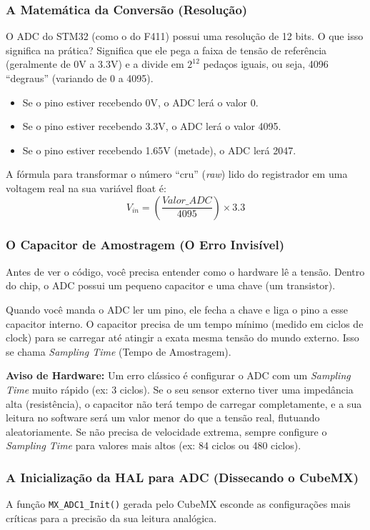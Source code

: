 \documentclass[12pt,a4paper]{article}
\begin{document}
\subsubsection{A Matemática da Conversão (Resolução)}
O ADC do STM32 (como o do F411) possui uma resolução de 12 bits. O que isso significa na prática?
Significa que ele pega a faixa de tensão de referência (geralmente de 0V a 3.3V) e a divide em $2^{12}$ pedaços iguais, ou seja, 4096 ``degraus'' (variando de 0 a 4095).
\begin{itemize}
    \item Se o pino estiver recebendo 0V, o ADC lerá o valor 0.
    \item Se o pino estiver recebendo 3.3V, o ADC lerá o valor 4095.
    \item Se o pino estiver recebendo 1.65V (metade), o ADC lerá 2047.
\end{itemize}

A fórmula para transformar o número ``cru'' (\textit{raw}) lido do registrador em uma voltagem real na sua variável float é:
\[ V_{in} = \left( \frac{Valor\_ADC}{4095} \right) \times 3.3 \]

\subsubsection{O Capacitor de Amostragem (O Erro Invisível)}
Antes de ver o código, você precisa entender como o hardware lê a tensão. Dentro do chip, o ADC possui um pequeno capacitor e uma chave (um transistor).



Quando você manda o ADC ler um pino, ele fecha a chave e liga o pino a esse capacitor interno. O capacitor precisa de um tempo mínimo (medido em ciclos de clock) para se carregar até atingir a exata mesma tensão do mundo externo. Isso se chama \textit{Sampling Time} (Tempo de Amostragem).

\textbf{Aviso de Hardware:} Um erro clássico é configurar o ADC com um \textit{Sampling Time} muito rápido (ex: 3 ciclos). Se o seu sensor externo tiver uma impedância alta (resistência), o capacitor não terá tempo de carregar completamente, e a sua leitura no software será um valor menor do que a tensão real, flutuando aleatoriamente. Se não precisa de velocidade extrema, sempre configure o \textit{Sampling Time} para valores mais altos (ex: 84 ciclos ou 480 ciclos).

\vspace{0.3cm}
\subsubsection{A Inicialização da HAL para ADC (Dissecando o CubeMX)}
A função \texttt{MX\_ADC1\_Init()} gerada pelo CubeMX esconde as configurações mais críticas para a precisão da sua leitura analógica.
\end{document}
